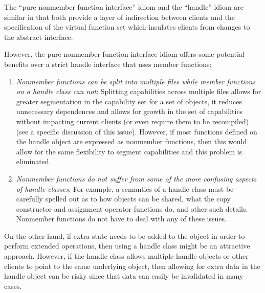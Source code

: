 \documentclass[pdf,ps2pdf,11pt]{SANDreport}
\begin{document}
The ``pure nonmember function interface'' idiom and the ``handle'' idiom are
similar in that both provide a layer of indirection between clients and the
specification of the virtual function set which insulates clients from changes
to the abstract interface.

However, the pure nonmember function interface idiom offers some potential
benefits over a strict handle interface that uses member functions:

\begin{enumerate}

{}\item{}\textit{Nonmember functions can be split into multiple files while
member functions on a handle class can not}: Splitting capabilities across
multiple files allows for greater segmentation in the capability set for a set
of objects, it reduces unnecessary dependences and allows for growth in the
set of capabilities without impacting current clients (or even require them to
be recompiled) (see {}\cite[Item 23]{EffectiveC++3rd} a specific discussion of
this issue).  However, if most functions defined on the handle object are
expressed as nonmember functions, then this would allow for the same
flexibility to segment capabilities and this problem is eliminated.

{}\item{}\textit{Nonmember functions do not suffer from some of the more
confusing aspects of handle classes}.  For example, a semantics of a handle
class must be carefully spelled out as to how objects can be shared, what the
copy constructor and assignment operator functions do, and other such details.
Nonmember functions do not have to deal with any of these issues.

\end{enumerate}

On the other hand, if extra state needs to be added to the object in order to
perform extended operations, then using a handle class might be an attractive
approach.  However, if the handle class allows multiple handle objects or
other clients to point to the same underlying object, then allowing for extra
data in the handle object can be risky since that data can easily be
invalidated in many cases.
\end{document}

